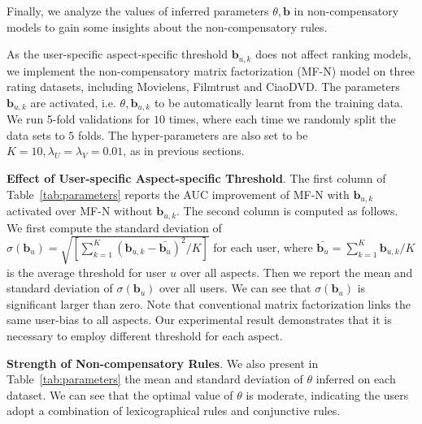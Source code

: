 \documentclass[letterpaper]{article} %
\begin{document}
Finally, we analyze the values of inferred parameters $\theta,\mathbf{b}$ in non-compensatory models to gain some insights about the non-compensatory rules. 

As the user-specific aspect-specific threshold $\mathbf{b}_{u,k}$ does not affect ranking models, we implement the non-compensatory matrix factorization (MF-N) model on three rating datasets, including Movielens, Filmtrust and CiaoDVD. The parameters $\mathbf{b}_{u,k}$ are activated, i.e. $\theta,\mathbf{b}_{u,k}$ to be automatically learnt from the training data. We run 5-fold validations for $10$ times, where each time we randomly split the data sets to $5$ folds. The hyper-parameters are also set to be $K=10, \lambda_U=\lambda_V=0.01$, as in previous sections.

\textbf{Effect of User-specific Aspect-specific Threshold}. The first column of Table~\ref{tab:parameters} reports the AUC improvement of MF-N with $\mathbf{b}_{u,k}$ activated over MF-N without $\mathbf{b}_{u,k}$. The second column is computed as follows. We first compute the standard deviation of $\sigma(\mathbf{b}_{u})=\sqrt {[\sum_{k=1}^{K} (\mathbf{b}_{u,k}-\bar{\mathbf{b}_u})^2 /K]} $ for each user, where $\bar{\mathbf{b}_u}=\sum_{k=1}^K \mathbf{b}_{u,k} /K$ is the average threshold for user $u$ over all aspects. Then we report the mean and standard deviation of $\sigma(\mathbf{b}_{u})$ over all users. We can see that $\sigma(\mathbf{b}_{u})$ is significant larger than zero. Note that conventional matrix factorization links the same user-bias to all aspects. Our experimental result demonstrates that it is necessary to employ different threshold for each aspect. 

\textbf{Strength of Non-compensatory Rules}. We also present in Table~\ref{tab:parameters} the mean and standard deviation of $\theta$ inferred on each dataset. We can see that the optimal value of $\theta$ is moderate, indicating the users adopt a combination of lexicographical rules and conjunctive rules.  

\begin{table}[htp]
\caption{AUC improvements with $\mathbf{b}$ activated, scale of parameters $\mathbf{b}_{u,k}$ and $\theta$.}
\small
\centering
{}
\label{tab:parameters}
\end{table}
\end{document}
